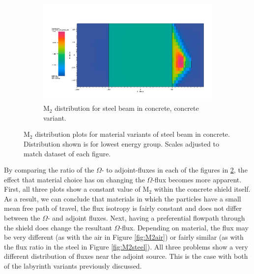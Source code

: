 \begin{figure}[htb!]\ContinuedFloat
  \centering
  \begin{subfigure}[t]{\textwidth}
    \includegraphics[width=0.9\linewidth]{./chapters/characterization_probs/figures/char/prob1v2/prob1v2M2G26.png}
    \caption{M$_2$ distribution for steel beam in concrete, concrete variant.}
    \label{fig:M2concrete}
  \end{subfigure}
  \caption[M$_2$ distribution plots for material variants of steel beam in
  concrete.]{M$_2$ distribution plots for material variants of steel beam in
  concrete. Distribution shown is for lowest energy group. Scales adjusted to
  match dataset of each figure.}
  \label{fig:M2beamplots}
\end{figure}

By comparing the ratio of the $\Omega$- to adjoint-fluxes in each of the figures
in \ref{fig:M2beamplots}, the effect that material choice has on changing the
$\Omega$-flux becomes more apparent. First, all three plots show a constant
value of M$_2$ within the concrete shield itself. As a result, we can conclude
that materials in which the particles have a small mean free path of travel, the
flux isotropy is fairly constant and does not differ between the $\Omega$- and
adjoint fluxes. Next, having a preferential flowpath through the shield does
change the resultant $\Omega$-flux. Depending on material, the flux may be very
different (as with the air in Figure \ref{fig:M2air}) or fairly similar (as with
the flux ratio in the steel in Figure \ref{fig:M2steel}). All three problems
show a very different distribution of fluxes near the adjoint source. This is
the case with both of the labyrinth variants previously discussed.

